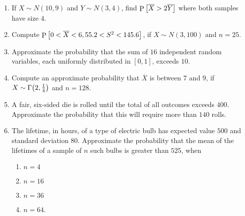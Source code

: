 \documentclass[svgnames]{amsart}
\DeclareMathOperator{\Prob}{P}
\begin{document}
\begin{enumerate}[leftmargin=*, itemsep=0.3em]
\item If $X \sim N(10, 9)$ and $Y \sim N(3, 4)$, find $\Prob\bqty{\overline X > 2 \overline Y}$ where both samples have size $4$.

\item Compute $\Prob\bqty{0 < \overline X < 6, 55.2 < S^2 < 145.6}$, if $X \sim N(3, 100)$ and $n = 25$.

\item Approximate the probability that the sum of $16$ independent random variables, each uniformly distributed in $[0, 1]$, exceeds $10$.

\item Compute an approximate probability that $\overline X$ is between $7$ and $9$, if $X \sim \Gamma\pqty{2, \frac 1 4}$ and $n = 128$.

\item A fair, six-sided die is rolled until the total of all outcomes exceeds $400$. Approximate the probability that this will require more than $140$ rolls.

\item The lifetime, in hours, of a type of electric bulb has expected value $500$ and standard deviation $80$. Approximate the probability that the mean of the lifetimes of a sample of $n$ such bulbs is greater than $525$, when
\begin{enumerate}[label=(\roman*)]
\item $n = 4$
\item $n = 16$
\item $n = 36$
\item $n = 64$.
\end{enumerate}

\end{enumerate}
\end{document}
